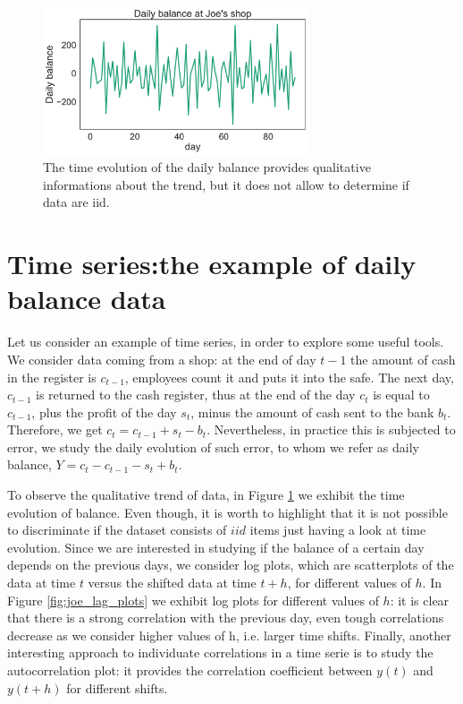 \documentclass[twoside,onecolumn]{article}
\theoremstyle{definition}
\begin{document}
\begin{figure} \centering
\includegraphics[width=0.7\textwidth]{../figs/joe_lineplot.pdf}
\caption{The time evolution of the daily balance provides qualitative informations about the trend, but it does not allow to determine if data are iid.}\label{fig:lineplot_joe}
\end{figure}

\section{Time series:the example of daily balance data}
Let us consider an example of time series, in order to explore some useful tools.
We consider data coming from a shop: at the end of day $t-1$ the amount of cash in the register is $c_{t-1}$, employees count it and puts it into the safe. The next day, $c_{t-1}$ is returned to the cash register, thus at the end of the day $c_t$ is equal to $c_{t-1}$, plus the profit of the day $s_t$, minus the amount of cash sent to the bank $b_t$. Therefore, we get $c_t=c_{t-1}+s_t-b_t$. Nevertheless, in practice this is subjected to error, we study the daily evolution of such error, to whom we refer as daily balance, $Y=c_t-c_{t-1}-s_t+b_t$.

To observe the qualitative trend of data, in Figure \ref{fig:lineplot_joe} we exhibit the time evolution of balance. Even though, it is worth to highlight that it is not possible to discriminate if the dataset consists of $iid$ items just having a look at time evolution. Since we are interested in studying if the balance of a certain day depends on the previous days, we consider log plots, which are scatterplots of the data at time $t$ versus the shifted data at time $t+h$, for different values of $h$. In Figure \ref{fig:joe_lag_plots} we exhibit log plots for different values of $h$: it is clear that there is a strong correlation with the previous day, even tough correlations decrease as we consider higher values of h, i.e. larger time shifts. Finally, another interesting approach to individuate correlations in a time serie is to study the autocorrelation plot: it provides the correlation coefficient between $y(t)$ and $y(t+h)$ for different shifts. 
\end{document}
